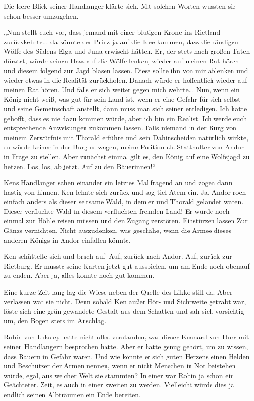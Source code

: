 \documentclass[10pt, a4paper, oneside]{book}
\begin{document}
Die leere Blick seiner Handlanger klärte sich. Mit solchen Worten wussten sie schon besser umzugehen.

„Nun stellt euch vor, dass jemand mit einer blutigen Krone ins Rietland zurückkehrte... da könnte der Prinz ja auf die Idee kommen, dass die räudigen Wölfe des Südens Elga und Juna erwischt hätten. Er, der stets nach großen Taten dürstet, würde seinen Hass auf die Wölfe lenken, wieder auf meinen Rat hören und diesem folgend zur Jagd blasen lassen. Diese sollte ihn von mir ablenken und wieder etwas in die Realität zurückholen. Danach würde er hoffentlich wieder auf meinen Rat hören. Und falls er sich weiter gegen mich wehrte... Nun, wenn ein König nicht weiß, was gut für sein Land ist, wenn er eine Gefahr für sich selbst und seine Gemeinschaft anstellt, dann muss man sich seiner entledigen. Ich hatte gehofft, dass es nie dazu kommen würde, aber ich bin ein Realist. Ich werde euch entsprechende Anweisungen zukommen lassen. Falls niemand in der Burg von meinem Zerwürfnis mit Thorald erführe und sein Dahinscheiden natürlich wirkte, so würde keiner in der Burg es wagen, meine Position als Statthalter von Andor in Frage zu stellen. Aber zunächst einmal gilt es, den König auf eine Wolfsjagd zu hetzen. Los, los, ab jetzt. Auf zu den Bäuerinnen!“

Kens Handlanger sahen einander ein letztes Mal fragend an und zogen dann hastig von hinnen. Ken lehnte sich zurück und sog tief Atem ein. Ja, Andor roch einfach anders als dieser seltsame Wald, in dem er und Thorald gelandet waren. Dieser verfluchte Wald in diesem verfluchten fremden Land! Er würde noch einmal zur Höhle reisen müssen und den Zugang zerstören. Einstürzen lassen Zur Gänze vernichten. Nicht auszudenken, was geschähe, wenn die Armee dieses anderen Königs in Andor einfallen könnte.

Ken schüttelte sich und brach auf. Auf, zurück nach Andor. Auf, zurück zur Rietburg. Er musste seine Karten jetzt gut ausspielen, um am Ende noch obenauf zu enden. Aber ja, alles konnte noch gut kommen.\bigskip







Eine kurze Zeit lang lag die Wiese neben der Quelle des Likko still da. Aber verlassen war sie nicht. Denn sobald Ken außer Hör- und Sichtweite getrabt war, löste sich eine grün gewandete Gestalt aus dem Schatten und sah sich vorsichtig um, den Bogen stets im Anschlag.

Robin von Loksley hatte nicht alles verstanden, was dieser Kennard von Dorr mit seinen Handlangern besprochen hatte. Aber er hatte genug gehört, um zu wissen, dass Bauern in Gefahr waren. Und wie könnte er sich guten Herzens einen Helden und Beschützer der Armen nennen, wenn er nicht Menschen in Not beistehen würde, egal, aus welcher Welt sie stammten? In einer war Robin ja schon ein Geächteter. Zeit, es auch in einer zweiten zu werden. Vielleicht würde dies ja endlich seinen Albträumen ein Ende bereiten.
\end{document}
